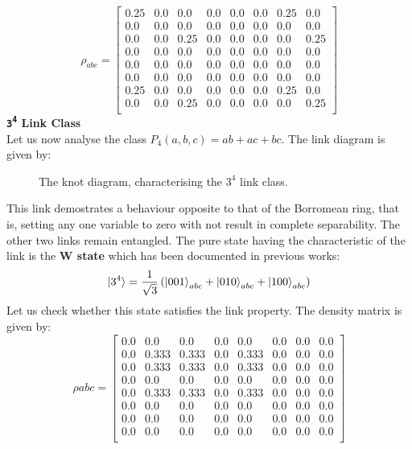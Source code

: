 \documentclass{scrartcl}
\begin{document}
\begin{equation}
    \rho_{abc}=
    \left[
    \begin{array}{cccccccc}
    0.25 & 0.0 & 0.0 & 0.0 & 0.0 & 0.0 & 0.25 & 0.0 \\
    0.0 & 0.0 & 0.0 & 0.0 & 0.0 & 0.0 & 0.0 & 0.0 \\
    0.0 & 0.0 & 0.25 & 0.0 & 0.0 & 0.0 & 0.0 & 0.25 \\
    0.0 & 0.0 & 0.0 & 0.0 & 0.0 & 0.0 & 0.0 & 0.0 \\
    0.0 & 0.0 & 0.0 & 0.0 & 0.0 & 0.0 & 0.0 & 0.0 \\
    0.0 & 0.0 & 0.0 & 0.0 & 0.0 & 0.0 & 0.0 & 0.0 \\
    0.25 & 0.0 & 0.0 & 0.0 & 0.0 & 0.0 & 0.25 & 0.0 \\
    0.0 & 0.0 & 0.25 & 0.0 & 0.0 & 0.0 & 0.0 & 0.25 \\
    \end{array}
    \right]
    \end{equation}
\textbf{\large \texttt{3\textsuperscript{4}} Link Class} \\[0.3cm]
Let us now analyse the class $P_4(a,b,c) = ab+ac+bc$. The link diagram is given by:
\begin{figure}[H]
    \centering
    
  \caption{The knot diagram, characterising the $3^4$ link class.}
\end{figure}
\noindent
This link demostrates a behaviour opposite to that of the Borromean ring, that is, setting any one variable to zero with not result in complete separability. The other two links remain entangled. The pure state having the characteristic of the link is the \textbf{W state} which has been documented in previous works:
$$\ket{3^4} = \frac{1}{\sqrt{3}}\left( \ket{001}_{abc}+\ket{010}_{abc}+\ket{100}_{abc} \right)$$ 
Let us check whether this state satisfies the link property. The density matrix is given by:
\begin{equation}
    \rho{abc}=
    \left[
    \begin{array}{cccccccc}
    0.0 & 0.0 & 0.0 & 0.0 & 0.0 & 0.0 & 0.0 & 0.0 \\
    0.0 & 0.333 & 0.333 & 0.0 & 0.333 & 0.0 & 0.0 & 0.0 \\
    0.0 & 0.333 & 0.333 & 0.0 & 0.333 & 0.0 & 0.0 & 0.0 \\
    0.0 & 0.0 & 0.0 & 0.0 & 0.0 & 0.0 & 0.0 & 0.0 \\
    0.0 & 0.333 & 0.333 & 0.0 & 0.333 & 0.0 & 0.0 & 0.0 \\
    0.0 & 0.0 & 0.0 & 0.0 & 0.0 & 0.0 & 0.0 & 0.0 \\
    0.0 & 0.0 & 0.0 & 0.0 & 0.0 & 0.0 & 0.0 & 0.0 \\
    0.0 & 0.0 & 0.0 & 0.0 & 0.0 & 0.0 & 0.0 & 0.0 \\
    \end{array}
    \right]
    \end{equation}
\end{document}

